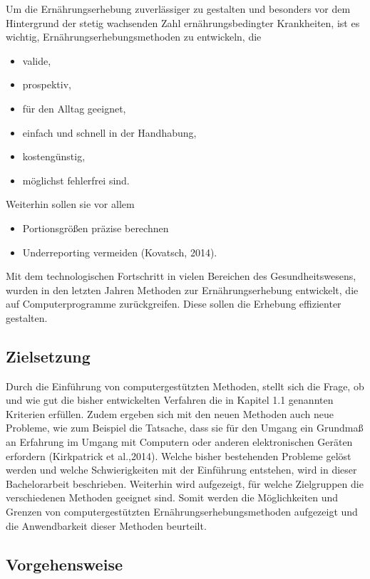 Um die Ernährungserhebung zuverlässiger zu gestalten und besonders vor dem Hintergrund der stetig wachsenden Zahl ernährungsbedingter Krankheiten, ist es wichtig, Ernährungserhebungsmethoden zu entwickeln, die 
\begin{itemize}
\item valide,
\item prospektiv,
\item für den Alltag geeignet,
\item einfach und schnell in der Handhabung,
\item kostengünstig,
\item möglichst fehlerfrei sind.
\end{itemize}

Weiterhin sollen sie vor allem
\begin{itemize}
\item Portionsgrößen präzise berechnen
\item Underreporting vermeiden (Kovatsch, 2014).
\end{itemize}

Mit dem technologischen Fortschritt in vielen Bereichen des Gesundheitswesens, wurden in den letzten Jahren Methoden zur Ernährungserhebung entwickelt, die auf Computerprogramme zurückgreifen. Diese sollen die Erhebung effizienter gestalten. 


\subsection{Zielsetzung}

Durch die Einführung von computergestützten Methoden, stellt sich die Frage, ob und wie gut die bisher entwickelten Verfahren die in Kapitel 1.1 genannten Kriterien erfüllen. Zudem ergeben sich mit den neuen Methoden auch neue Probleme, wie zum Beispiel die Tatsache, dass sie für den Umgang ein Grundmaß an Erfahrung im Umgang mit Computern oder anderen elektronischen Geräten erfordern (Kirkpatrick et al.,2014). Welche bisher bestehenden Probleme gelöst werden und welche Schwierigkeiten mit der Einführung entstehen, wird in dieser Bachelorarbeit beschrieben. Weiterhin wird aufgezeigt, für welche Zielgruppen die verschiedenen Methoden geeignet sind.
Somit werden die Möglichkeiten und Grenzen von computergestützten Ernährungserhebungsmethoden aufgezeigt und die Anwendbarkeit dieser Methoden beurteilt. 

\subsection{Vorgehensweise}

